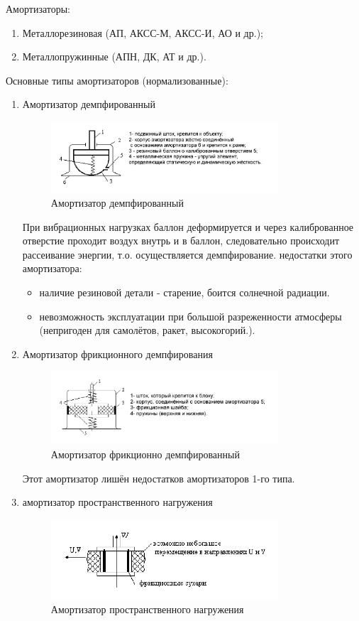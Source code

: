 \documentclass[unicode, 12pt, a4paper, oneside]{article}
\begin{document}
Амортизаторы:
\begin{enumerate}
\item Металлорезиновая (АП, АКСС-М, АКСС-И, АО и др.);
\item Металлопружинные (АПН, ДК, АТ и др.).
\end{enumerate}
Основные типы амортизаторов (нормализованные):
\begin{enumerate}
\item Амортизатор демпфированный
\begin{figure}[H]
\centering
\includegraphics[width=0.8\textwidth]{68_AD2.JPG}
\caption{Амортизатор демпфированный}
\end{figure}
При вибрационных нагрузках баллон деформируется и через калиброванное отверстие проходит воздух внутрь и в баллон, следовательно происходит рассеивание энергии, т.о. осуществляется демпфирование.
недостатки этого амортизатора:
\begin{itemize}
\item	наличие резиновой детали - старение, боится солнечной радиации. 
\item	невозможность эксплуатации при большой разреженности атмосферы (непригоден для самолётов, ракет, высокогорий.).
\end{itemize}

\item Амортизатор фрикционного демпфирования
\begin{figure}[H]
\centering
\includegraphics[width=0.8\textwidth]{68_AFD.JPG}
\caption{Амортизатор фрикционно демпфированный}
\end{figure}

Этот амортизатор лишён недостатков амортизаторов 1-го типа.

\item амортизатор пространственного нагружения
\begin{figure}[H]
\centering
\includegraphics[width=0.8\textwidth]{68_APN.JPG}
\caption{Амортизатор пространственного нагружения}
\end{figure}


\end{enumerate}
\end{document}
